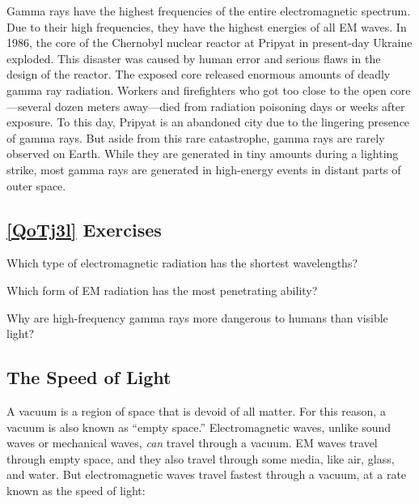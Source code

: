 \documentclass{article}
\numberwithin{equation}{section}
\numberwithin{figure}{section}
\begin{document}
\vspace{1em}

Gamma rays have the highest frequencies of the entire electromagnetic spectrum. Due to their high frequencies, they have the highest energies of all EM waves. In 1986, the core of the Chernobyl nuclear reactor at Pripyat in present-day Ukraine exploded. This disaster was caused by human error and serious flaws in the design of the reactor. The exposed core released enormous amounts of deadly gamma ray radiation. Workers and firefighters who got too close to the open core---several dozen meters away---died from radiation poisoning days or weeks after exposure. To this day, Pripyat is an abandoned city due to the lingering presence of gamma rays. But aside from this rare catastrophe, gamma rays are rarely observed on Earth. While they are generated in tiny amounts during a lighting strike, most gamma rays are generated in high-energy events in distant parts of outer space. 

\subsection*{\ref{QoTj3l} Exercises}

\begin{exercise}
    Which type of electromagnetic radiation has the shortest wavelengths?
\end{exercise}

\begin{exercise}
    Which form of EM radiation has the most penetrating ability?
\end{exercise}

\begin{exercise}
    Why are high-frequency gamma rays more dangerous to humans than visible light?
\end{exercise}



\subsection{The Speed of Light} \label{VDAtHN}

A vacuum is a region of space that is devoid of all matter. For this reason, a vacuum is also known as ``empty space.'' Electromagnetic waves, unlike sound waves or mechanical waves, \textit{can} travel through a vacuum. EM waves travel through empty space, and they also travel through some media, like air, glass, and water. But electromagnetic waves travel fastest through a vacuum, at a rate known as the speed of light:
\end{document}
